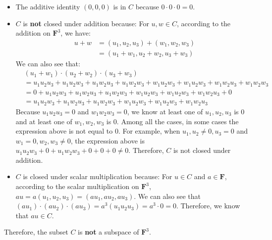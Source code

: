 \documentclass[12pt, letterpaper, oneside]{book}
\begin{document}
\begin{itemize}
  \item The additive identity $(0, 0, 0)$ is in $C$ because $0 \cdot 0 \cdot 0
          = 0$.
  \item $C$ is \textbf{not} closed under addition because: For $u, w \in C$,
        according to the addition on $\mathbf{F}^3$, we have:
        \begin{equation*}
          \begin{split}
            u + w
            & = (u_1, u_2, u_3) + (w_1, w_2, w_3) \\
            & = (u_1 + w_1, u_2 + w_2, u_3 + w_3)
          \end{split}
        \end{equation*}
        We can also see that:
        \begin{equation*}
          \begin{split}
            & (u_1 + w_1) \cdot (u_2 + w_2) \cdot (u_3 + w_3) \\
            & = u_1 u_2 u_3 + u_1 u_2 w_3 + u_1 w_2 u_3 + u_1 w_2 w_3 +
            w_1 u_2 w_3 + w_1 u_2 w_3 + w_1 w_2 u_3 + w_1 w_2 w_3 \\
            & = 0 + u_1 u_2 w_3 + u_1 w_2 u_3 + u_1 w_2 w_3 + w_1 u_2 w_3 +
            w_1 u_2 w_3 + w_1 w_2 u_3 + 0 \\
            & = u_1 u_2 w_3 + u_1 w_2 u_3 + u_1 w_2 w_3 + w_1 u_2 w_3 + w_1 u_2 w_3
            + w_1 w_2 u_3
          \end{split}
        \end{equation*}
        Because $u_1 u_2 u_3 = 0$ and $w_1 w_2 w_3 = 0$, we know at least one of
        $u_1, u_2, u_3$ is 0 and at least one of $w_1, w_2, w_3$ is 0. Among all
        the cases, in some cases the expression above is not equal to 0. For
        example, when $u_1, u_2 \neq 0, u_3 = 0$ and $w_1 = 0, w_2, w_3 \neq 0$,
        the expression above is $u_1 u_2 w_3 + 0 + u_1 w_2 w_3 + 0 + 0 + 0 \neq 0$.
        Therefore, $C$ is not closed under addition.
  \item $C$ is closed under scalar multiplication because: For $u \in C$ and
        $a \in \mathbf{F}$, according to the scalar multiplication on
        $\mathbf{F}^3$, $au = a(u_1, u_2, u_3) = (a u_1, a u_2, a u_3)$. We can
        also see that $(a u_1) \cdot (a u_2) \cdot (a u_3) = a^3(u_1 u_2 u_3) =
          a^3 \cdot 0 = 0$. Therefore, we know that $au \in C$.
\end{itemize}

Therefore, the subset $C$ is \textbf{not} a subspace of $\mathbf{F}^3$.
\end{document}
